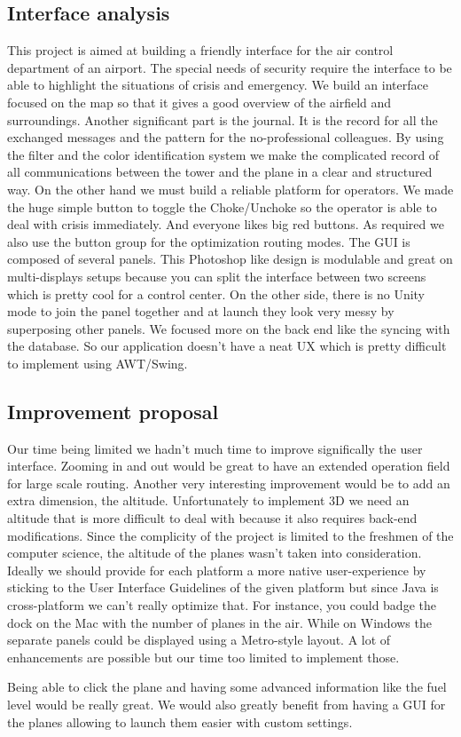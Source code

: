 \documentclass{article}
\begin{document}
\subsection{Interface analysis}

This project is aimed at building a friendly interface for the air control department of an airport. The special needs of security require the interface to be able to highlight the situations of crisis and emergency. We build an interface focused on the map so that it gives a good overview of the airfield and surroundings.  Another significant part is the journal. It is the record for all the exchanged messages and the pattern for the no-professional colleagues. By using the filter and the color identification system we make the complicated record of all communications between the tower and the plane in a clear and structured way.
On the other hand we must build a reliable platform for operators. We made the huge simple button to toggle the Choke/Unchoke so the operator is able to deal with crisis immediately. And everyone likes big red buttons. As required we also use the button group for the optimization routing modes. The GUI is composed of several panels. This Photoshop like design is modulable and great on multi-displays setups because you can split the interface between two screens which is pretty cool for a control center. On the other side, there is no Unity mode to join the panel together and at launch they look very messy by superposing other panels. We focused more on the back end like the syncing with the database. So our application doesn't have a neat UX which is pretty difficult to implement using AWT/Swing.

\subsection{Improvement proposal}

Our time being limited we hadn't much time to improve significally the user interface. Zooming in and out would be great to have an extended operation field for large scale routing. Another very interesting improvement would be to add an extra dimension, the altitude. Unfortunately to implement 3D we need an altitude that is more difficult to deal with because it also requires back-end modifications. Since the complicity of the project is limited to the freshmen of the computer science, the altitude of the planes wasn't taken into consideration.
Ideally we should provide for each platform a more native user-experience by sticking to the User Interface Guidelines of the given platform but since Java is cross-platform we can't really optimize that.
For instance, you could badge the dock on the Mac with the number of planes in the air. While on Windows the separate panels could be displayed using a Metro-style layout. A lot of enhancements are possible but our time too limited to implement those.

Being able to click the plane and having some advanced information like the fuel level would be really great. We would also greatly benefit from having a GUI for the planes allowing to launch them easier with custom settings.
\end{document}
